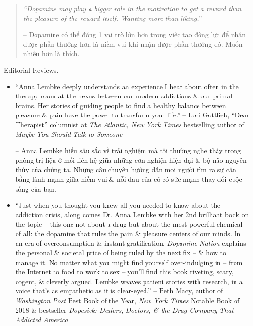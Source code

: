 \documentclass{article}
\begin{document}
\begin{enumerate}
\begin{quotation}
		{\it``Dopamine may play a bigger role in the motivation to get a reward than the pleasure of the reward itself. Wanting more than liking.''}

		-- Dopamine có thể đóng 1 vai trò lớn hơn trong việc tạo động lực để nhận được phần thưởng hơn là niềm vui khi nhận được phần thưởng đó. Muốn nhiều hơn là thích.
	\end{quotation}
	{\sf Editorial Reviews.}
	\begin{itemize}
		\item ``{\sc Anna Lembke} deeply understands an experience I hear about often in the therapy room at the nexus between our modern addictions \& our primal brains. Her stories of guiding people to find a healthy balance between pleasure \& pain have the power to transform your life.'' -- {\sc Lori Gottlieb}, ``Dear Therapist'' columnist at {\it The Atlantic, New York Times} bestselling author of {\it Maybe You Should Talk to Someone}

		-- {\sc Anna Lembke} hiểu sâu sắc về trải nghiệm mà tôi thường nghe thấy trong phòng trị liệu ở mối liên hệ giữa những cơn nghiện hiện đại \& bộ não nguyên thủy của chúng ta. Những câu chuyện hướng dẫn mọi người tìm ra sự cân bằng lành mạnh giữa niềm vui \& nỗi đau của cô có sức mạnh thay đổi cuộc sống của bạn.
		\item ``Just when you thought you knew all you needed to know about the addiction crisis, along comes Dr. {\sc Anna Lembke} with her 2nd brilliant book on the topic -- this one not about a drug but about the most powerful chemical of all: the dopamine that rules the pain \& pleasure centers of our minds. In an era of overconsumption \& instant gratification, {\it Dopamine Nation} explains the personal \& societal price of being ruled by the next fix -- \& how to manage it. No matter what you might find yourself over-indulging in -- from the Internet to food to work to sex -- you'll find this book riveting, scary, cogent, \& cleverly argued. Lembke weaves patient stories with research, in a voice that's as empathetic as it is clear-eyed.'' -- {\sc Beth Macy}, author of {\it Washington Post} Best Book of the Year, {\it New York Times} Notable Book of 2018 \& bestseller {\it Dopesick: Dealers, Doctors, \& the Drug Company That Addicted America}


\end{itemize}
\end{enumerate}
\end{document}
